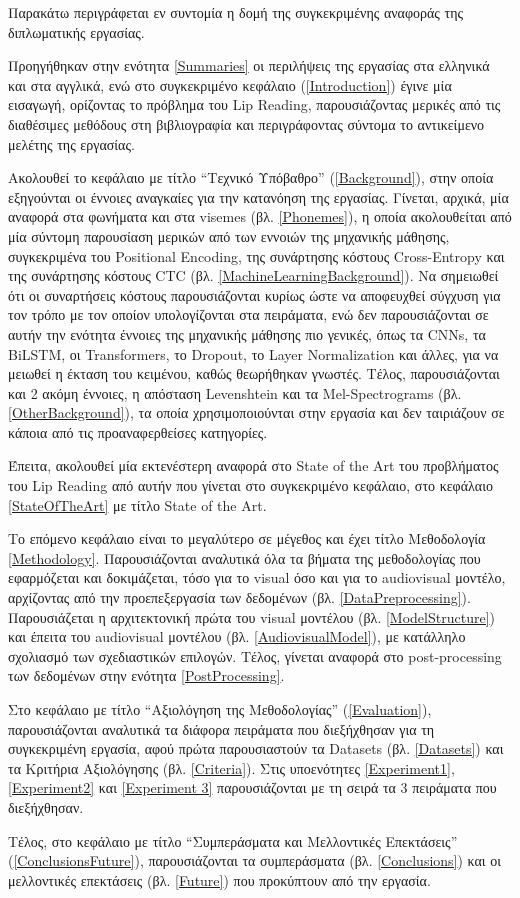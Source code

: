 Παρακάτω περιγράφεται εν συντομία η δομή της συγκεκριμένης αναφοράς της διπλωματικής εργασίας.

Προηγήθηκαν στην ενότητα \ref{Summaries} οι περιλήψεις της εργασίας στα ελληνικά και στα αγγλικά, ενώ στο συγκεκριμένο κεφάλαιο (\ref{Introduction}) έγινε μία εισαγωγή, ορίζοντας το πρόβλημα του Lip Reading, παρουσιάζοντας μερικές από τις διαθέσιμες μεθόδους στη βιβλιογραφία και περιγράφοντας σύντομα το αντικείμενο μελέτης της εργασίας.

Ακολουθεί το κεφάλαιο με τίτλο ``Τεχνικό Υπόβαθρο'' (\ref{Background}), στην οποία εξηγούνται οι έννοιες αναγκαίες για την κατανόηση της εργασίας. Γίνεται, αρχικά, μία αναφορά στα φωνήματα και στα visemes (βλ. \ref{Phonemes}), η οποία ακολουθείται από μία σύντομη παρουσίαση μερικών από των εννοιών της μηχανικής μάθησης, συγκεκριμένα του Positional Encoding, της συνάρτησης κόστους Cross-Entropy και της συνάρτησης κόστους CTC (βλ. \ref{MachineLearningBackground}). Να σημειωθεί ότι οι συναρτήσεις κόστους παρουσιάζονται κυρίως ώστε να αποφευχθεί σύγχυση για τον τρόπο με τον οποίον υπολογίζονται στα πειράματα, ενώ δεν παρουσιάζονται σε αυτήν την ενότητα έννοιες της μηχανικής μάθησης πιο γενικές, όπως τα CNNs, τα BiLSTM, οι Transformers, το Dropout, το Layer Normalization και άλλες, για να μειωθεί η έκταση του κειμένου, καθώς θεωρήθηκαν γνωστές. Τέλος, παρουσιάζονται και 2 ακόμη έννοιες, η απόσταση Levenshtein και τα Mel-Spectrograms (βλ. \ref{OtherBackground}), τα οποία χρησιμοποιούνται στην εργασία και δεν ταιριάζουν σε κάποια από τις προαναφερθείσες κατηγορίες.

Έπειτα, ακολουθεί μία εκτενέστερη αναφορά στο State of the Art του προβλήματος του Lip Reading από αυτήν που γίνεται στο συγκεκριμένο κεφάλαιο, στο κεφάλαιο \ref{StateOfTheArt} με τίτλο State of the Art.

Το επόμενο κεφάλαιο είναι το μεγαλύτερο σε μέγεθος και έχει τίτλο Μεθοδολογία \ref{Methodology}. Παρουσιάζονται αναλυτικά όλα τα βήματα της μεθοδολογίας που εφαρμόζεται και δοκιμάζεται, τόσο για το visual όσο και για το audiovisual μοντέλο, αρχίζοντας από την προεπεξεργασία των δεδομένων (βλ. \ref{DataPreprocessing}). Παρουσιάζεται η αρχιτεκτονική πρώτα του visual μοντέλου (βλ. \ref{ModelStructure}) και έπειτα του audiovisual μοντέλου (βλ. \ref{AudiovisualModel}), με κατάλληλο σχολιασμό των σχεδιαστικών επιλογών. Τέλος, γίνεται αναφορά στο post-processing των δεδομένων στην ενότητα \ref{PostProcessing}.

Στο κεφάλαιο με τίτλο ``Αξιολόγηση της Μεθοδολογίας'' (\ref{Evaluation}), παρουσιάζονται αναλυτικά τα διάφορα πειράματα που διεξήχθησαν για τη συγκεκριμένη εργασία, αφού πρώτα παρουσιαστούν τα Datasets (βλ. \ref{Datasets}) και τα Κριτήρια Αξιολόγησης (βλ. \ref{Criteria}). Στις υποενότητες \ref{Experiment1}, \ref{Experiment2} και \ref{Experiment 3} παρουσιάζονται με τη σειρά τα 3 πειράματα που διεξήχθησαν.

Τέλος, στο κεφάλαιο με τίτλο ``Συμπεράσματα και Μελλοντικές Επεκτάσεις'' (\ref{ConclusionsFuture}), παρουσιάζονται τα συμπεράσματα (βλ. \ref{Conclusions}) και οι μελλοντικές επεκτάσεις (βλ. \ref{Future}) που προκύπτουν από την εργασία.
